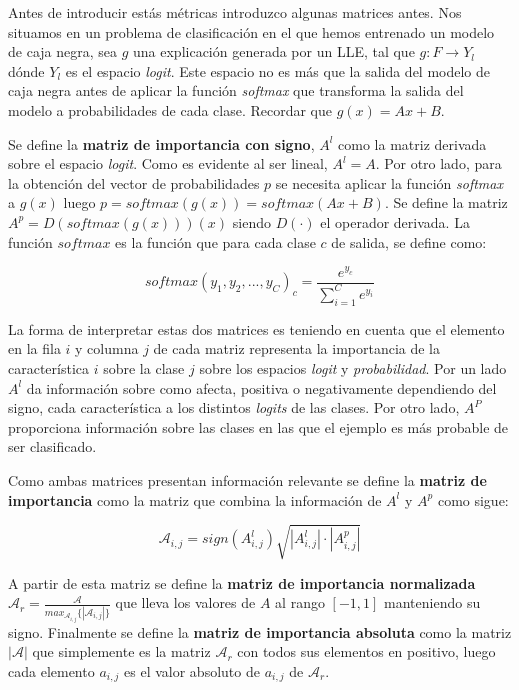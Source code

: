Antes de introducir estás métricas introduzco algunas matrices antes. Nos situamos en un problema de clasificación en el que hemos entrenado un modelo de caja negra, sea $g$ una explicación generada por un LLE, tal que $g: F \rightarrow Y_l$ dónde $Y_l$ es el espacio \textit{logit}. Este espacio no es más que la salida del modelo de caja negra antes de aplicar la función \textit{softmax} que transforma la salida del modelo a probabilidades de cada clase. Recordar que $g(x) = Ax + B$. 

Se define la \textbf{matriz de importancia con signo}, $A^l$ como la matriz derivada sobre el espacio \textit{logit}. Como es evidente al ser lineal, $A^l = A$. Por otro lado, para la obtención del vector de probabilidades $p$ se necesita aplicar la función \textit{softmax} a $g(x)$ luego $p=softmax(g(x))=softmax(Ax+B)$. Se define la matriz $A^p = D(softmax(g(x)))(x)$ siendo $D(\cdot)$ el operador derivada. La función $softmax$ es la función que para cada clase $c$ de salida, se define como:

\begin{equation}
softmax(y_1,y_2,...,y_C)_c = \frac{e^{y_c}}{\sum_{i=1}^C e^{y_i}}
\end{equation}
 
La forma de interpretar estas dos matrices es teniendo en cuenta que el elemento en la fila $i$ y columna $j$ de cada matriz representa la importancia de la característica $i$ sobre la clase $j$ sobre los espacios \textit{logit} y \textit{probabilidad}. Por un lado $A^l$ da información sobre como afecta, positiva o negativamente dependiendo del signo, cada característica a los distintos \textit{logits} de las clases. Por otro lado, $A^P$ proporciona información sobre las clases en las que el ejemplo es más probable de ser clasificado.

Como ambas matrices presentan información relevante se define la \textbf{matriz de importancia} como la matriz que combina la información de $A^l$ y $A^p$ como sigue:

\begin{equation}
\mathcal{A}_{i,j} = sign(A^l_{i,j}) \sqrt{|A^l_{i,j}|\cdot|A^p_{i,j}|}
\end{equation}

A partir de esta matriz se define la \textbf{matriz de importancia normalizada} $\mathcal{A}_r=\frac{\mathcal{A}}{ max_{\mathcal{A}_{i,j}}\{|\mathcal{A}_{i,j}|\} }$ que lleva los valores de $A$ al rango $[-1,1]$ manteniendo su signo. Finalmente se define la \textbf{matriz de importancia absoluta} como la matriz $|\mathcal{A}|$ que simplemente es la matriz $\mathcal{A}_r$ con todos sus elementos en positivo, luego cada elemento $a_{i,j}$ es el valor absoluto de $a_{i,j}$ de $\mathcal{A}_r$.


